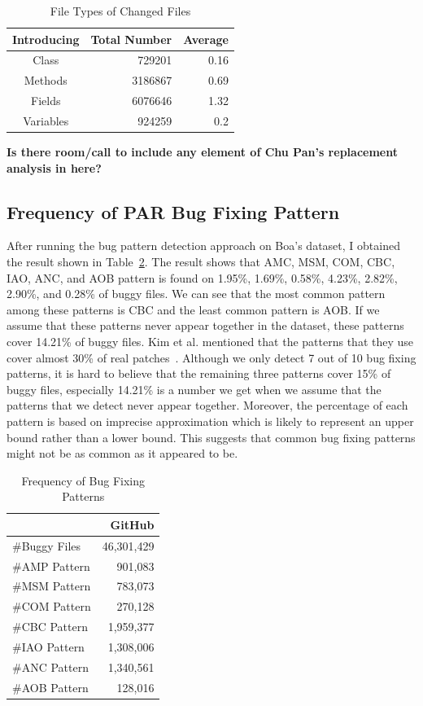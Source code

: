 \documentclass{sig-alternate-05-2015}
\newcommand{\todo}[1]
  {{\scriptsize \textbf{\color{red} {#1}}}}
\begin{document}
\begin{table}
\centering
  \begin{tabular}{| c | r | r |}
  \hline
  Introducing & Total Number & Average \\ \hline \hline
  Class & 729201 & 0.16 \\ \hline
  Methods & 3186867 & 0.69 \\ \hline
  Fields & 6076646 & 1.32 \\ \hline
  Variables & 924259 & 0.2 \\ \hline
  \end{tabular}
  \caption{File Types of Changed Files}
  \label{tbl:new}
\end{table}

\todo{Is there room/call to include any element of Chu Pan's replacement
  analysis in here?}

\subsection{Frequency of PAR Bug Fixing Pattern}\label{sec:freqfixpattern}
After running the bug pattern detection approach on Boa's dataset, I obtained the result shown in Table~\ref{tab:freqpattern}. The result shows that AMC, MSM, COM, CBC, IAO, ANC, and AOB pattern is found on 1.95\%, 1.69\%, 0.58\%, 4.23\%, 2.82\%, 2.90\%, and 0.28\% of buggy files. We can see that the most common pattern among these patterns is CBC and the least common pattern is AOB. If we assume that these patterns never appear together in the dataset, these patterns cover 14.21\% of buggy files. Kim et al. mentioned that the patterns that they use cover almost 30\% of real patches~\cite{kim2013}. Although we only detect 7 out of 10 bug fixing patterns, it is hard to believe that the remaining three patterns cover 15\% of buggy files, especially 14.21\% is a number we get when we assume that the patterns that we detect never appear together. Moreover, the percentage of each pattern is based on imprecise approximation which is likely to represent an upper bound rather than a lower bound. This suggests that common bug fixing patterns might not be as common as it appeared to be.

\begin{table}[!htb]
	\caption{Frequency of Bug Fixing Patterns}\label{tab:freqpattern}
	\centering
	\begin{tabular}{lr} 
		\hline
		& \textbf{GitHub}\\
		\hline
		\#Buggy Files & 46,301,429 \\ 
		\#AMP Pattern & 901,083 \\
		\#MSM Pattern & 783,073 \\
		\#COM Pattern & 270,128 \\ 
		\#CBC Pattern & 1,959,377 \\  
		\#IAO Pattern & 1,308,006 \\  
		\#ANC Pattern & 1,340,561 \\  
		\#AOB Pattern & 128,016 \\  
		\hline
	\end{tabular}
\end{table}
\end{document}
